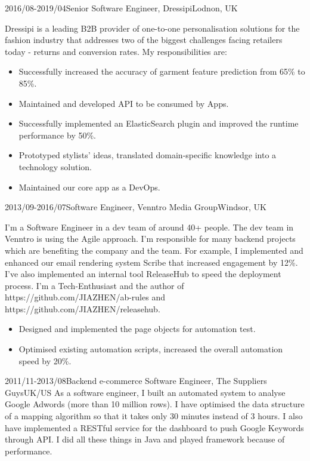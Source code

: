 \documentclass[a4paper]{twentysecondcv-english} %
\begin{document}
\begin{twenty}
	\twentyitem
	    {2016/08-2019/04}{Senior Software Engineer, Dressipi}{Lodnon, UK}
    	{Dressipi is a leading B2B provider of one-to-one personalisation solutions for the fashion industry that addresses two of the biggest challenges facing retailers today - returns and conversion rates. My responsibilities are:
        	\begin{itemize}
                \item Successfully increased the accuracy of garment feature prediction from 65\% to 85\%.
                \item Maintained and developed API to be consumed by Apps.
                \item Successfully implemented an ElasticSearch plugin and improved the runtime performance by 50\%.
                \item Prototyped stylists' ideas, translated domain-specific knowledge into a technology solution.
                \item Maintained our core app as a DevOps.
            \end{itemize}}
\end{twenty}

\newpage %
\makesidebar

\begin{twenty}
    \twentyitem
	    {2013/09-2016/07}{Software Engineer, Venntro Media Group}{Windsor, UK}
    	{I'm a Software Engineer in a dev team of around 40+ people. The dev team in Venntro is using the Agile approach. I'm responsible for many backend projects which are benefiting the company and the team. For example, I implemented and enhanced our email rendering system Scribe that increased engagement by 12\%. I've also implemented an internal tool ReleaseHub to speed the deployment process. I'm a Tech-Enthusiast and the author of https://github.com/JIAZHEN/ab-rules and https://github.com/JIAZHEN/releasehub.
        	\begin{itemize}
                \item Designed and implemented the page objects for automation test.
                \item Optimised existing automation scripts, increased the overall automation speed by 20\%.
            \end{itemize}}
    \twentyitem
	    {2011/11-2013/08}{Backend e-commerce Software Engineer, The Suppliers Guys}{UK/US}
    	{As a software engineer, I built an automated system to analyse Google Adwords (more than 10 million rows). I have optimised the data structure of a mapping algorithm so that it takes only 30 minutes instead of 3 hours. I also have implemented a RESTful service for the dashboard to push Google Keywords through API. I did all these things in Java and played framework because of performance.}
\end{twenty}
\end{document}
